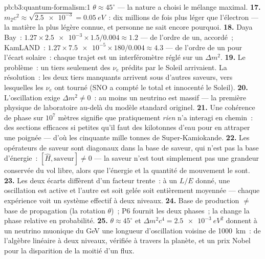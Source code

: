 \begin{solution}{pb:b3:quantum-formalism:1}
$\theta \approx 45^\circ$ --- la nature a choisi le mélange maximal.
\textbf{17.} $m_2c^2 \approx \sqrt{\num{2.5e-3}} = \qty{0.05}{eV}$~:
dix millions de fois plus léger que l'électron --- la matière la plus
légère connue, et personne ne sait encore pourquoi.
\textbf{18.} Daya Bay~: $1.27 \times \num{2.5e-3} \times 1.5/0.004
\approx 1.2$ --- de l'ordre de un, accordé~; KamLAND~: $1.27 \times
\num{7.5e-5} \times 180/0.004 \approx 4.3$ --- de l'ordre de un pour
l'écart solaire~: chaque trajet est un interféromètre réglé sur un
$\Delta m^2$.
\textbf{19.} Le problème~: un tiers seulement des $\nu_e$ prédits par
le Soleil arrivaient. La résolution~: les deux tiers manquants
arrivent sous d'autres saveurs, vers lesquelles les $\nu_e$ ont tourné
(SNO a compté le total et innocenté le Soleil).
\textbf{20.} L'oscillation exige $\Delta m^2 \neq 0$~: au moins un
neutrino est massif --- la première physique de laboratoire au-delà du
modèle standard originel.
\textbf{21.} Une cohérence de phase sur $10^7$ mètres signifie que
pratiquement \emph{rien} n'a interagi en chemin~: des sections
efficaces si petites qu'il faut des kilotonnes d'eau pour en attraper
une poignée --- d'où les cinquante mille tonnes de Super-Kamiokande.
\textbf{22.} Les opérateurs de saveur sont diagonaux dans la base de
saveur, qui n'est pas la base d'énergie~:
$[\hat H, \text{saveur}] \neq 0$ --- la saveur n'est tout simplement
pas une grandeur conservée du vol libre, alors que l'énergie et la
quantité de mouvement le sont.
\textbf{23.} Les deux écarts diffèrent d'un facteur trente~: à un
$L/E$ donné, une oscillation est active et l'autre est soit gelée soit
entièrement moyennée --- chaque expérience voit un système effectif à
deux niveaux.
\textbf{24.} Base de production $\neq$ base de propagation (la
rotation $\theta$)~; P6 fournit les deux phases~; la 
change la phase relative en probabilité.
\textbf{25.} $\theta \approx 45^\circ$ et $\Delta m^2c^4 =
\qty{2.5e-3}{eV^2}$ donnent à un neutrino muonique du GeV une longueur
d'oscillation voisine de \qty{1000}{km}~: de l'algèbre linéaire à deux
niveaux, vérifiée à travers la planète, et un prix Nobel pour la
disparition de la moitié d'un flux.
\end{solution}
